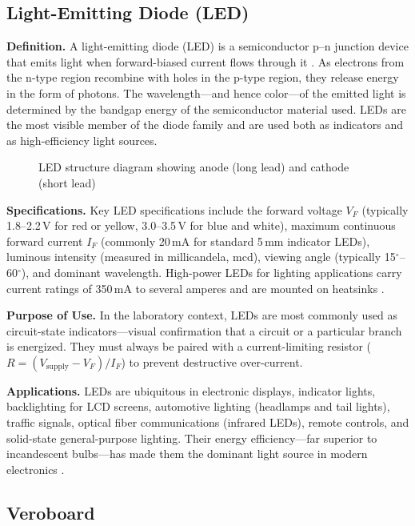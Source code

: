 \documentclass[12pt, a4paper, twoside]{report}
\newcommand{\imgplaceholder}[2]{%
  \begin{figure}[H]
    \centering
    \fcolorbox{gray!60}{gray!12}{%
      \parbox[c][5cm][c]{0.65\textwidth}{%
        \centering
        \textcolor{gray!80}{\Large [Image Placeholder]}\\[6pt]
        \textcolor{gray}{\small Insert figure here}
      }%
    }
    \caption{#1}
    \label{fig:#2}
  \end{figure}
}
\begin{document}
\subsection{Light-Emitting Diode (LED)}

\textbf{Definition.}\quad
A light-emitting diode (LED) is a semiconductor p--n junction device that emits light
when forward-biased current flows through it \cite{sedra2020}. As electrons from the
n-type region recombine with holes in the p-type region, they release energy in the
form of photons. The wavelength---and hence color---of the emitted light is determined
by the bandgap energy of the semiconductor material used. LEDs are the most visible
member of the diode family and are used both as indicators and as high-efficiency light
sources.

\imgplaceholder{LED structure diagram showing anode (long lead) and cathode (short lead)}{led}

\textbf{Specifications.}\quad
Key LED specifications include the forward voltage $V_F$ (typically 1.8--2.2\,V for red
or yellow, 3.0--3.5\,V for blue and white), maximum continuous forward current $I_F$
(commonly 20\,mA for standard 5\,mm indicator LEDs), luminous intensity (measured in
millicandela, mcd), viewing angle (typically 15$^\circ$--60$^\circ$), and dominant
wavelength. High-power LEDs for lighting applications carry current ratings of 350\,mA
to several amperes and are mounted on heatsinks \cite{horowitz2015}.

\textbf{Purpose of Use.}\quad
In the laboratory context, LEDs are most commonly used as circuit-state indicators---visual
confirmation that a circuit or a particular branch is energized. They must always be paired
with a current-limiting resistor ($R = (V_\text{supply} - V_F)/I_F$) to prevent
destructive over-current.

\textbf{Applications.}\quad
LEDs are ubiquitous in electronic displays, indicator lights, backlighting for LCD
screens, automotive lighting (headlamps and tail lights), traffic signals, optical fiber
communications (infrared LEDs), remote controls, and solid-state general-purpose lighting.
Their energy efficiency---far superior to incandescent bulbs---has made them the
dominant light source in modern electronics \cite{razavi2013}.

\subsection{Veroboard}
\end{document}
